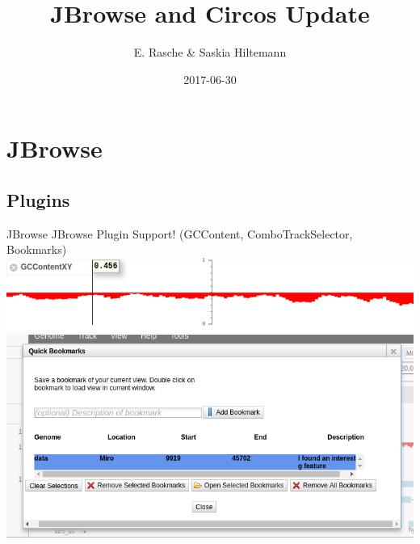 \documentclass[12pt]{phage3slides} %
\title[JBrowse and Circos Update]{JBrowse and Circos Update}
\author[ER/SH]{E. Rasche \& Saskia Hiltemann}
\date{2017-06-30}
\begin{document}
\frame{\titlepage}


\section{JBrowse}
{
  \begin{frame}[plain]
  \end{frame}
}

\subsection{Plugins}
{
\begin{frame}{JBrowse}
	JBrowse Plugin Support! ({\color{gray}GCContent, ComboTrackSelector, Bookmarks})
	\includegraphics[width=\textwidth]{plugin-gc.png} \\
	\includegraphics[width=\textwidth]{plugin-book.png}
\end{frame}
}
\end{document}
